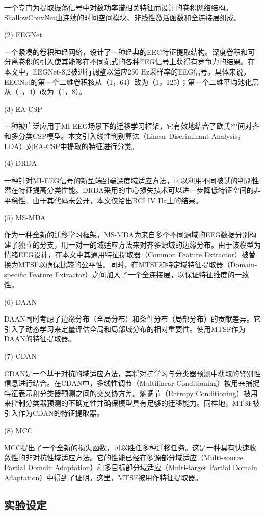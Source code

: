 一个专门为提取振荡信号中对数功率谱相关特征而设计的卷积网络结构。ShallowConvNet由连续的时间空间模块、非线性激活函数和全连接层组成。

(2) EEGNet

一个紧凑的卷积神经网络，设计了一种经典的EEG特征提取结构。深度卷积和可分离卷积的引入使其能够在不同范式的各种EEG信号上获得有竞争力的结果。在本文中，EEGNet-8,2被进行调整以适应250 Hz采样率的EEG信号。具体来说，EEGNet的第一个二维卷积核从（1，64）改为（1，125）；第一个二维平均池化层从（1，4）改为（1，8）。

(3) EA-CSP

一种被广泛应用于MI-EEG场景下的迁移学习框架，它有效地结合了欧氏空间对齐和多分类CSP模型。本文引入线性判别算法（Linear Discriminant Analysis，LDA）对EA-CSP中提取的特征进行分类。

(4) DRDA

一种针对MI-EEG信号的新型端到端深度域适应方法，可以利用不同被试的判别性潜在特征提高分类性能。DRDA采用的中心损失技术可以进一步降低特征空间的非平稳性。由于其代码未公开，本文仅给出BCI IV IIa上的结果。

(5) MS-MDA

作为一种全新的迁移学习框架，MS-MDA为来自多个不同源域的EEG数据分别构建了独立的分支，用一对一的域适应方法来对齐多源域的边缘分布。由于该模型为情绪EEG设计，在本文中其通用特征提取器（Common Feature Extractor）被替换为MTSF以确保比较的公平性。同时，在MTSF和特定域特征提取器（Domain-specific Feature Extractor）之间加入了一个全连接层，以保证特征维度的一致性。

(6) DAAN

DAAN同时考虑了边缘分布（全局分布）和条件分布（局部分布）的贡献差异。它引入了动态学习来定量评估全局和局部域分布的相对重要性。使用MTSF作为DAAN的特征提取器。

(7) CDAN

CDAN是一个基于对抗的域适应方法，其将对抗学习与分类器预测中获取的鉴别性信息进行结合。在CDAN中，多线性调节（Multilinear Conditioning）被用来捕捉特征表示和分类器预测之间的交叉协方差。熵调节（Entropy Conditioning）被用来控制分类器预测的不确定性并确保模型具有足够的迁移能力。同样地，MTSF被引入作为CDAN的特征提取器。

(8) MCC

MCC提出了一个全新的损失函数，可以胜任多种迁移任务。这是一种具有快速收敛性的非对抗性域适应方法。它的性能已经在多源部分域适应（Multi-source Partial Domain Adaptation）和多目标部分域适应（Multi-target Partial Domain Adaptation）中得到了证明。这里，MTSF被用作特征提取器。

\subsection{实验设定}

